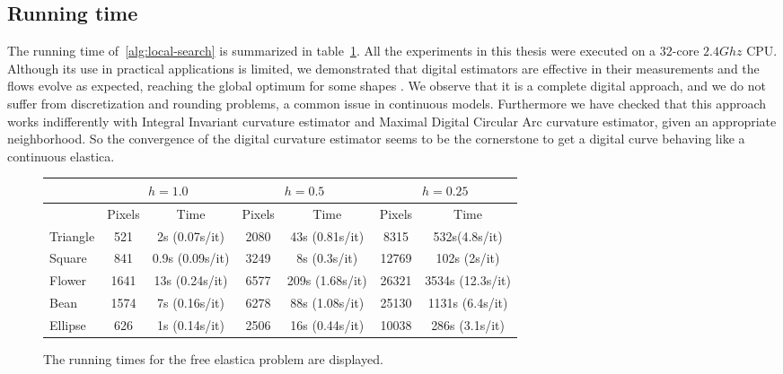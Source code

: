 \subsection{Running time}
\label{ch5:subsec:running-time}

The running time of~\cref{alg:local-search} is summarized in table~\cref{tab:summary-local-comb-rtime}. All the experiments in this thesis were executed on a $32$-core $2.4Ghz$ CPU. Although its use in practical applications is
limited, we demonstrated that digital estimators are effective in their measurements and the flows evolve as expected, reaching the global optimum for some shapes . We
observe that it is a complete digital approach, and we do not suffer from discretization and rounding problems, a common
issue in continuous models.  Furthermore we have checked that this approach works indifferently with Integral Invariant
curvature estimator and Maximal Digital Circular Arc curvature estimator, given an appropriate neighborhood. So the convergence of the digital curvature
estimator seems to be the cornerstone to get a digital curve behaving like a continuous elastica. 

\begin{figure}[h!]
\center
\captionsetup{type=table}
\footnotesize
\begin{tabular}{|l|c|c|c|c|c|c|}
\hline
& \multicolumn{2}{c|}{$h=1.0$} & \multicolumn{2}{c|}{$h=0.5$} & \multicolumn{2}{c|}{$h=0.25$}\\
\hline
& Pixels & Time & Pixels & Time & Pixels & Time\\
\hline
Triangle & 521 & 2s (0.07s/it)  & 2080 & 43s (0.81s/it) & 8315 & 532s(4.8s/it)\\
Square & 841 & 0.9s (0.09s/it) & 3249 & 8s (0.3s/it) & 12769 & 102s (2s/it)\\
Flower & 1641 & 13s (0.24s/it) & 6577 & 209s (1.68s/it) & 26321 & 3534s (12.3s/it)\\
Bean  & 1574 & 7s (0.16s/it) & 6278 & 88s (1.08s/it) & 25130 & 1131s (6.4s/it)\\
Ellipse  & 626 & 1s (0.14s/it) & 2506 & 16s (0.44s/it) & 10038 & 286s (3.1s/it)\\
\hline
\end{tabular}
\caption{ The running times for the free elastica problem are displayed. }
\label{tab:summary-local-comb-rtime} 
\end{figure}





